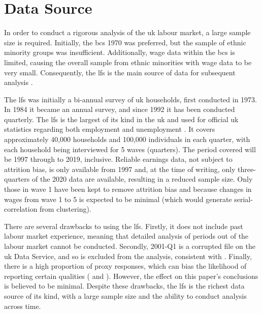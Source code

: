 \documentclass[class=article, crop=false]{standalone}
\begin{document}
\section{Data Source}
\label{sec:Data}
In order to conduct a rigorous analysis of the \acrshort{uk} labour market, a large sample size is required. Initially, the \acrfull{bcs} 1970 was preferred, but the sample of ethnic minority groups was insufficient. Additionally, wage data within the \acrshort{bcs} is limited, causing the overall sample from ethnic minorities with wage data to be very small. Consequently, the \acrfull{lfs} is the main source of data for subsequent analysis \citep{ONSk}.

The \acrshort{lfs} was initially a bi-annual survey of \acrshort{uk} households, first conducted in 1973. In 1984 it became an annual survey, and since 1992 it has been conducted quarterly. The \acrshort{lfs} is the largest of its kind in the \acrshort{uk} and used for official \acrshort{uk} statistics regarding both employment and unemployment \citep{ONS}. It covers approximately 40,000 households and 100,000 individuals in each quarter, with each household being interviewed for 5 waves (quarters). The period covered will be 1997 through to 2019, inclusive. Reliable earnings data, not subject to attrition bias, is only available from 1997 \citep{ONSa} and, at the time of writing, only three-quarters of the 2020 data are available, resulting in a reduced sample size. Only those in wave 1 have been kept to remove attrition bias and because changes in wages from wave 1 to 5 is expected to be minimal (which would generate serial-correlation from clustering).


There are several drawbacks to using the \acrshort{lfs}. Firstly, it does not include past labour market experience, meaning that detailed analysis of periods out of the labour market cannot be conducted. Secondly, 2001-Q1 is a corrupted file on the \acrshort{uk} Data Service, and so is excluded from the analysis, consistent with \citet{Longhi}. Finally, there is a high proportion of proxy responses, which can bias the likelihood of reporting certain qualities (\citet{Clarke} and \citet{Davies}). However, the effect on this paper's conclusions is believed to be minimal. Despite these drawbacks, the \acrshort{lfs} is the richest data source of its kind, with a large sample size and the ability to conduct analysis across time.
\end{document}

